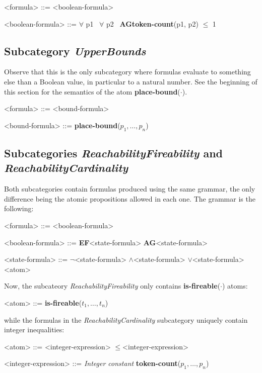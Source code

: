 \documentclass[10pt,english,a4paper]{article}
\newcommand\N                {\mathbb{N}}
\newcommand\ctla             {\textbf{A}\xspace}
\newcommand\ctle             {\textbf{E}\xspace}
\newcommand\ltlf             {\textbf{F}\xspace}
\newcommand\ltlg             {\textbf{G}\xspace}
\newcommand\logicnot         {\boldmath$\lnot$\xspace}
\newcommand\logicand         {\boldmath$\land$\xspace}
\newcommand\logicor          {\boldmath$\lor$\xspace}
\newcommand\quantall         {\boldmath$\forall$\xspace}
\newcommand\atomleq          {\boldmath$\leq$\xspace}
\newcommand\atomisfire[1]    {\textbf{is-fireable}(#1)}
\newcommand\atomplacebnd[1]  {\textbf{place-bound}(#1)}
\newcommand\atomtokenscnt[1] {\textbf{token-count}(#1)}
\newcommand\mysubsection[1]{\color{sectioncolor}\subsection{#1}\color{defaultcolor}}
\begin{document}
\begin{grammar}

<formula> ::= <boolean-formula>

<boolean-formula> ::= \quantall p1~ \quantall p2~ \ctla \ltlg \atomtokenscnt{p1, p2} \atomleq 1

\end{grammar}

\mysubsection{Subcategory \textit{UpperBounds}}

Observe that this is the only subcategory where formulas evaluate to something
else than a Boolean value, in particular to %
a natural number. See the beginning of this section for the semantics
of the atom \atomplacebnd{$\cdot$}.

\begin{grammar}
<formula> ::= <bound-formula>

<bound-formula> ::= \atomplacebnd{$p_1, \ldots, p_n$}
\end{grammar}

\mysubsection{Subcategories \textit{ReachabilityFireability} and \textit{ReachabilityCardinality}}

Both subcategories contain formulas produced using the same grammar, the
only difference being the atomic propositions allowed in each one.
The grammar is the following:

\begin{grammar}
<formula> ::= <boolean-formula>

<boolean-formula> ::= \ctle \ltlf <state-formula>
\alt \ctla \ltlg <state-formula>

<state-formula> ::=  \logicnot  <state-formula>
 \logicand <state-formula>
 \logicor  <state-formula>
\alt <atom>
\end{grammar}

Now, the subcateory \emph{ReachabilityFireability} only contains
\atomisfire{$\cdot$} atoms:

\begin{grammar}
<atom> ::= \atomisfire{$t_1, \ldots, t_n$}
\end{grammar}

while the formulas in the \emph{ReachabilityCardinality} subcategory
uniquely contain integer inequalities:

\begin{grammar}
<atom> ::= <integer-expression> \atomleq <integer-expression>

<integer-expression> ::= \textit{Integer constant}
\alt \atomtokenscnt{$p_1, \ldots, p_n$}
\end{grammar}
\end{document}
